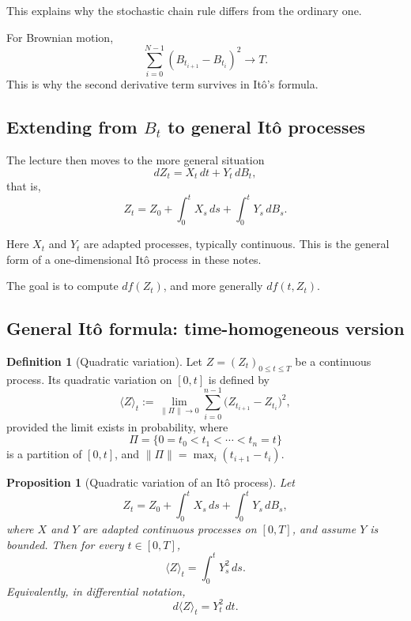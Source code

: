 \documentclass[11pt]{article}
\newtheorem{proposition}[theorem]{Proposition}
\theoremstyle{definition}
\newtheorem{definition}[theorem]{Definition}
\begin{document}
This explains why the stochastic chain rule differs from the ordinary one.

\begin{keyformula}
For Brownian motion,
\[
\sum_{i=0}^{N-1}(B_{t_{i+1}}-B_{t_i})^2 \to T.
\]
This is why the second derivative term survives in It\^o's formula.
\end{keyformula}

\subsection[Extending from Bt to general Ito processes]{Extending from \texorpdfstring{$B_t$}{Bt} to general It\^o processes}

The lecture then moves to the more general situation
\[
dZ_t=X_t\,dt+Y_t\,dB_t,
\]
that is,
\[
Z_t=Z_0+\int_0^t X_s\,ds+\int_0^t Y_s\,dB_s.
\]

Here \(X_t\) and \(Y_t\) are adapted processes, typically continuous. This is the general form of a one-dimensional It\^o process in these notes.

The goal is to compute \(df(Z_t)\), and more generally \(df(t,Z_t)\).

\subsection{General It\^o formula: time-homogeneous version}

\begin{definition}[Quadratic variation]
Let \(Z=(Z_t)_{0\le t\le T}\) be a continuous process. Its quadratic variation on \([0,t]\) is defined by
\[
\langle Z\rangle_t
:=
\lim_{\|\Pi\|\to 0}\sum_{i=0}^{n-1}\bigl(Z_{t_{i+1}}-Z_{t_i}\bigr)^2,
\]
provided the limit exists in probability, where
\[
\Pi=\{0=t_0<t_1<\cdots<t_n=t\}
\]
is a partition of \([0,t]\), and \(\|\Pi\|=\max_i (t_{i+1}-t_i)\).
\end{definition}

\begin{proposition}[Quadratic variation of an It\^o process]
Let
\[
Z_t=Z_0+\int_0^t X_s\,ds+\int_0^t Y_s\,dB_s,
\]
where \(X\) and \(Y\) are adapted continuous processes on \([0,T]\), and assume \(Y\) is bounded. Then for every \(t\in[0,T]\),
\[
\langle Z\rangle_t=\int_0^t Y_s^2\,ds.
\]
Equivalently, in differential notation,
\[
d\langle Z\rangle_t=Y_t^2\,dt.
\]
\end{proposition}
\end{document}
